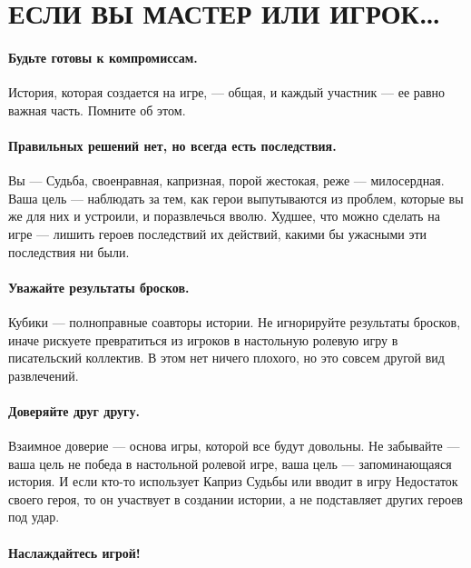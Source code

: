 \section*{ЕСЛИ ВЫ МАСТЕР ИЛИ ИГРОК…}

\paragraph{Будьте готовы к компромиссам.} История, которая создается на игре, — общая, и каждый участник — ее равно важная часть. Помните об этом.
\paragraph{Правильных решений нет, но всегда есть последствия.} Вы — Судьба, своенравная, капризная, порой жестокая, реже — милосердная. Ваша цель — наблюдать за тем, как герои выпутываются из проблем, которые вы же для них и устроили, и поразвлечься вволю. Худшее, что можно сделать на игре — лишить героев последствий их действий, какими бы ужасными эти последствия ни были.
\paragraph{Уважайте результаты бросков.} Кубики — полноправные соавторы истории. Не игнорируйте результаты бросков, иначе рискуете превратиться из игроков в настольную ролевую игру в писательский коллектив. В этом нет ничего плохого, но это совсем другой вид развлечений.
\paragraph{Доверяйте друг другу.} Взаимное доверие — основа игры, которой все будут довольны. Не забывайте — ваша цель не победа в настольной ролевой игре, ваша цель — запоминающаяся история. И если кто-то использует Каприз Судьбы или вводит в игру Недостаток своего героя, то он участвует в создании истории, а не подставляет других героев под удар.
\paragraph{Наслаждайтесь игрой!}